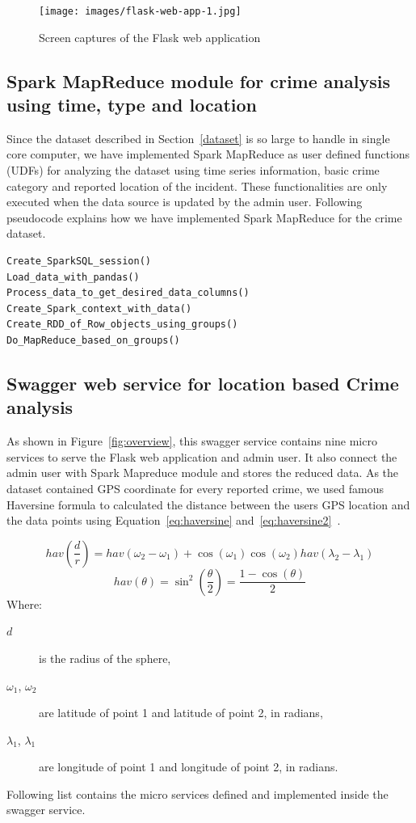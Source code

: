 \begin{figure}[htb]
	\centering\texttt{[image: images/flask-web-app-1.jpg]}
	\caption{Screen captures of the Flask web
        application}\label{fig:screencapture}
\end{figure}

\subsection{Spark MapReduce module for crime analysis using time,
type and location}\label{sparkModule}

Since the dataset described in Section~\ref{dataset} is so large to
handle in single core computer, we have implemented Spark MapReduce as
user defined functions (UDFs) for analyzing the dataset using time
series information, basic crime category and reported location of the
incident. These functionalities are only executed when the data source
is updated by the admin user. Following pseudocode explains how we
have implemented Spark MapReduce for the crime dataset.

\begin{verbatim}
Create_SparkSQL_session()
Load_data_with_pandas()
Process_data_to_get_desired_data_columns()
Create_Spark_context_with_data()
Create_RDD_of_Row_objects_using_groups()
Do_MapReduce_based_on_groups()
\end{verbatim}

\subsection{Swagger web service for location based Crime
analysis}\label{swaggerService}

As shown in Figure~\ref{fig:overview}, this swagger service contains
nine micro services to serve the Flask web application and admin
user. It also connect the admin user with Spark Mapreduce module and
stores the reduced data. As the dataset contained GPS coordinate for
every reported crime, we used famous Haversine formula to calculated
the distance between the users GPS location and the data points using
Equation~\ref{eq:haversine}
and~\ref{eq:haversine2}~\cite{hid-sp18-409-siahaan2017haversine}.

\begin{equation}\label{eq:haversine}
hav(\frac{d}{r}) = hav(\omega_2 - \omega_1)
+ \cos(\omega_1)\cos(\omega_2)hav(\lambda_2 - \lambda_1)
\end{equation}
\begin{equation}\label{eq:haversine2}
hav(\theta) = \sin^2(\frac{\theta}{2}) = \frac{1-\cos(\theta)}{2}
\end{equation}
Where:
\begin{description}
\item[$d$] is the radius of the sphere,
\item[$\omega_1$, $\omega_2$] are latitude of point 1 and latitude
of point 2, in radians,
\item[$\lambda_1$, $\lambda_1$] are longitude of point 1 and longitude
of point 2, in radians.
\end{description}
Following list contains the micro services defined and implemented inside
the swagger service.

